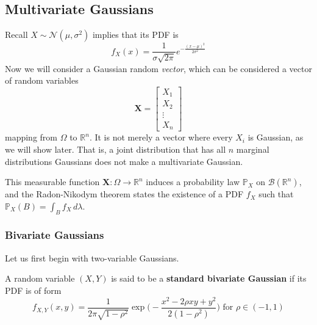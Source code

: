 \documentclass{article}
\begin{document}
  \subsection{Multivariate Gaussians}

  Recall $X \sim \mathcal{N}(\mu, \sigma^2)$ implies that its PDF is 
  \[f_X (x) = \frac{1}{\sigma \sqrt{2 \pi}} e^{-\frac{(x - \mu)^2}{2 \sigma^2}}\]
  Now we will consider a Gaussian random \textit{vector}, which can be considered a vector of random variables  
  \[\mathbf{X} = \begin{bmatrix} X_1 \\ X_2 \\ \vdots \\ X_n \end{bmatrix}\]
  mapping from $\Omega$ to $\mathbb{R}^n$. It is not merely a vector where every $X_i$ is Gaussian, as we will show later. That is, a joint distribution that has all $n$ marginal distributions Gaussians does not make a multivariate Gaussian. 

  This measurable function $\mathbf{X}: \Omega \rightarrow \mathbb{R}^n$ induces a probability law $\mathbb{P}_X$ on $\mathcal{B}(\mathbb{R}^n)$, and the Radon-Nikodym theorem states the existence of a PDF $f_X$ such that $\mathbb{P}_X (B) = \int_B f_X \,d\lambda$.

  \subsubsection{Bivariate Gaussians}
  Let us first begin with two-variable Gaussians. 

  \begin{definition}
  A random variable $(X, Y)$ is said to be a \textbf{standard bivariate Gaussian} if its PDF is of form
  \[f_{X, Y} (x, y) = \frac{1}{2 \pi \sqrt{1 - \rho^2}} \exp \bigg( -\frac{x^2 - 2 \rho x y + y^2}{2 (1 - \rho^2)} \bigg) \text{ for } \rho \in (-1, 1)\] 
  \end{definition}
\end{document}
